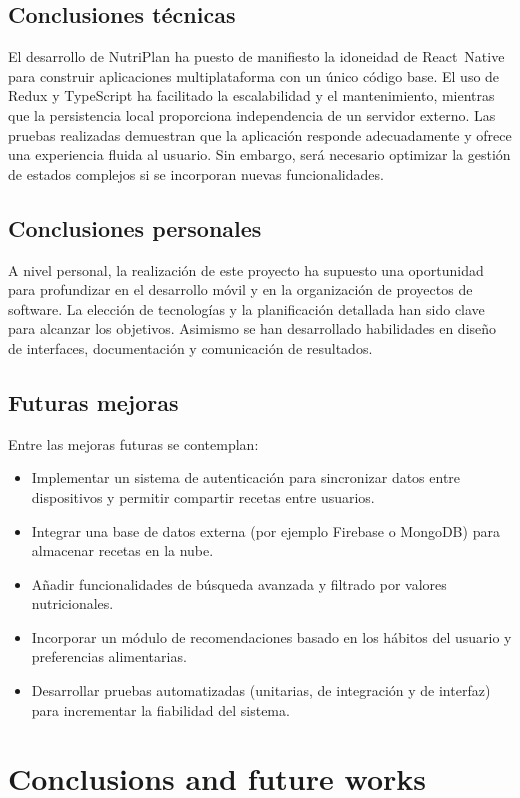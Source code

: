 \documentclass[twoside, openright, 11pt]{report}
\begin{document}
\section{Conclusiones técnicas}
El desarrollo de NutriPlan ha puesto de manifiesto la idoneidad de React Native para construir aplicaciones multiplataforma con un único código base. El uso de Redux y TypeScript ha facilitado la escalabilidad y el mantenimiento, mientras que la persistencia local proporciona independencia de un servidor externo. Las pruebas realizadas demuestran que la aplicación responde adecuadamente y ofrece una experiencia fluida al usuario. Sin embargo, será necesario optimizar la gestión de estados complejos si se incorporan nuevas funcionalidades.

\section{Conclusiones personales}
A nivel personal, la realización de este proyecto ha supuesto una oportunidad para profundizar en el desarrollo móvil y en la organización de proyectos de software. La elección de tecnologías y la planificación detallada han sido clave para alcanzar los objetivos. Asimismo se han desarrollado habilidades en diseño de interfaces, documentación y comunicación de resultados.

\section{Futuras mejoras}
Entre las mejoras futuras se contemplan:
\begin{itemize}
  \item Implementar un sistema de autenticación para sincronizar datos entre dispositivos y permitir compartir recetas entre usuarios.
  \item Integrar una base de datos externa (por ejemplo Firebase o MongoDB) para almacenar recetas en la nube.
  \item Añadir funcionalidades de búsqueda avanzada y filtrado por valores nutricionales.
  \item Incorporar un módulo de recomendaciones basado en los hábitos del usuario y preferencias alimentarias.
  \item Desarrollar pruebas automatizadas (unitarias, de integración y de interfaz) para incrementar la fiabilidad del sistema.
\end{itemize}

\chapter{Conclusions and future works}\label{cap.conclusions and future works}
\end{document}
